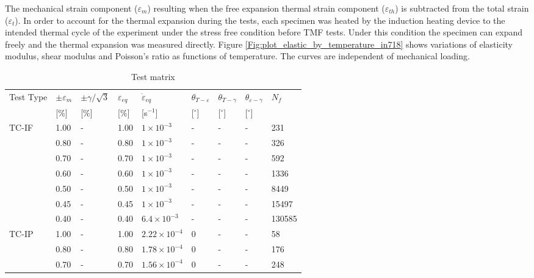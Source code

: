 \documentclass[preprint,5p,twocolumn,11pt,sort&compress]{elsarticle}
\begin{document}
The mechanical strain component ($\varepsilon_{m}$) resulting when the free expansion thermal strain component ($\varepsilon_{th}$) is subtracted from the total strain ($\varepsilon_{t}$). In order to account for the thermal expansion during the tests, each specimen was heated by the induction heating device to the intended thermal cycle of the experiment under the  stress free condition before TMF tests. Under this condition the specimen can expand freely and the thermal expansion was measured directly.
Figure \ref{Fig:plot_elastic_by_temperature_in718} shows variations of elasticity modulus, shear modulus and Poisson's ratio as functions of temperature. The curves are independent of mechanical loading.


\begin{table*}[htbp]
  \centering
  \caption{Test matrix} \vspace{0.1cm}
    \begin{tabular}{p{2cm}p{1.5cm}p{1.5cm}p{1.5cm}p{2.5cm}p{1cm}p{1cm}p{1cm}p{1cm}}
    \hline
    Test Type & $\pm \varepsilon _m$ & $\pm \gamma/ \sqrt 3$ & $\varepsilon _{eq}$ & $\dot \varepsilon _{eq}$ & $\theta_{T-\varepsilon}$ & $\theta_{T-\gamma}$ & $\theta_{\varepsilon-\gamma}$ & $N_f$ \\
          & [\%]  & [\%]  & [\%]  & [s$^{-1}$] & [$^\circ$] & [$^\circ$] & [$^\circ$] &  \\
    \hline
    TC-IF & 1.00  & -     & 1.00  & $1\times 10^{-3}$ & -     & -     & -     & 231 \\
          & 0.80  & -     & 0.80  & $1\times 10^{-3}$ & -     & -     & -     & 326 \\
          & 0.70  & -     & 0.70  & $1\times 10^{-3}$ & -     & -     & -     & 592 \\
          & 0.60  & -     & 0.60  & $1\times 10^{-3}$ & -     & -     & -     & 1336 \\
          & 0.50  & -     & 0.50  & $1\times 10^{-3}$ & -     & -     & -     & 8449 \\
          & 0.45  & -     & 0.45  & $1\times 10^{-3}$ & -     & -     & -     & 15497 \\
          & 0.40  & -     & 0.40  & $6.4\times 10^{-3}$ & -     & -     & -     & 130585 \\
    \hline
    TC-IP & 1.00  & -     & 1.00  & $2.22\times 10^{-4}$ & 0     & -     & -     & 58 \\
          & 0.80  & -     & 0.80  & $1.78\times 10^{-4}$ & 0     & -     & -     & 176 \\
          & 0.70  & -     & 0.70  & $1.56\times 10^{-4}$ & 0     & -     & -     & 248 \\

\end{tabular}
\end{table*}
\end{document}
